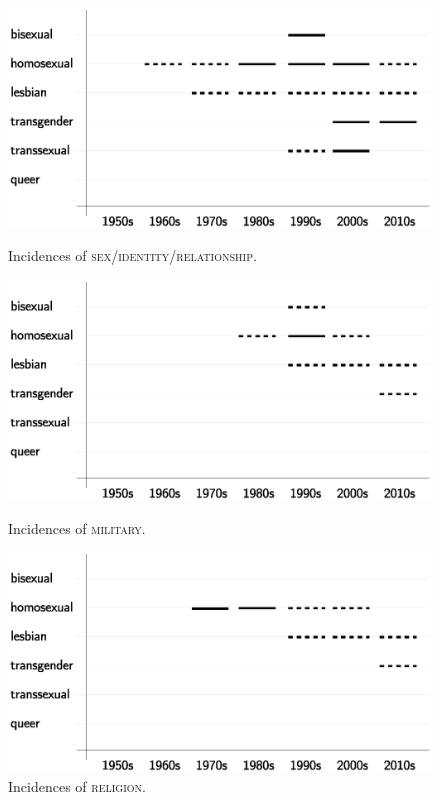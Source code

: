 \documentclass[10pt,a4paper,twocolumn]{scrartcl}
\begin{document}
\begin{figure}
\begin{minipage}{0.48\textwidth}
\includegraphics[width=\columnwidth]{figures/topic_identity}
\caption{Incidences of \textsc{sex/identity/relationship}.} \label{fig:topic_identity}

\includegraphics[width=\columnwidth]{figures/topic_military}
\caption{Incidences of \textsc{military}.} \label{fig:topic_military}
\end{minipage}
\hfill
\begin{minipage}{0.48\textwidth}
\includegraphics[width=\columnwidth]{figures/topic_religion}
\caption{Incidences of \textsc{religion}.} \label{fig:topic_religion}


\end{minipage}
\end{figure}
\end{document}

